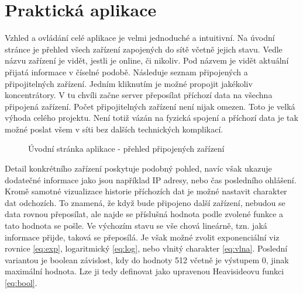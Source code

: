 \chapter{Praktická aplikace}
Vzhled a ovládání celé aplikace je velmi jednoduché a intuitivní. Na úvodní stránce je přehled všech zařízení zapojených do sítě včetně jejich stavu. Vedle názvu zařízení je vidět, jestli je online, či nikoliv. Pod názvem je vidět aktuální přijatá informace v číselné podobě. Následuje seznam připojených a připojitelných zařízení. Jedním kliknutím je možné propojit jakékoliv koncentrátory. V tu chvíli začne server přeposílat příchozí data na všechna připojená zařízení. Počet připojitelných zařízení není nijak omezen. Toto je velká výhoda celého projektu. Není totiž vázán na fyzická spojení a příchozí data je tak možné poslat všem v síti bez dalších technických komplikací.

\begin{figure}[h]
    \centering
	\caption{Úvodní stránka aplikace - přehled připojených zařízení}
	\label{fig:speedy1}
\end{figure}

Detail konkrétního zařízení poskytuje podobný pohled, navíc však ukazuje dodatečné informace jako jsou například IP adresy, nebo čas posledního ohlášení. Kromě samotné vizualizace historie příchozích dat je možné nastavit charakter dat odchozích. To znamená, že když bude připojeno další zařízení, nebudou se data rovnou přeposílat, ale najde se příslušná hodnota podle zvolené funkce a tato hodnota se pošle. Ve výchozím stavu se vše chová lineárně, tzn. jaká informace přijde, taková se přeposílá. Je však možné zvolit exponenciální viz rovnice \ref{eq:exp}, logaritmický \ref{eq:log}, nebo vlnitý charakter \ref{eq:vlna}. Poslední variantou je boolean závislost, kdy do hodnoty 512 včetně je výstupem 0, jinak maximální hodnota. Lze ji tedy definovat jako upravenou Heavisideovu funkci \ref{eq:bool}.

